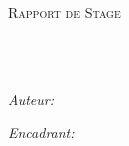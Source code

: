 \documentclass[
11pt, %
fr, %
singlespacing, %
headsepline, %
]{MastersDoctoralThesis} %
\author{Maxime \textsc{PICO}}
\begin{document}
\frontmatter %

\pagestyle{plain} %


\begin{titlepage}
\begin{center}

\vspace*{.06\textheight}
{\scshape\LARGE \univname\par}\vspace{1.5cm} %
\textsc{\Large Rapport de Stage}\\[0.5cm] %

\HRule \\[0.4cm] %
{\huge \bfseries \ttitle\par}\vspace{0.4cm} %
\HRule \\[1.5cm] %

\begin{minipage}[t]{0.4\textwidth}
\begin{flushleft} \large
\emph{Auteur:}\\
\authorname
\end{flushleft}
\end{minipage}
\begin{minipage}[t]{0.4\textwidth}
\begin{flushright} \large
\emph{Encadrant:} \\
\href{https://www.labri.fr/perso/falleri/}{\supname}
\end{flushright}
\end{minipage}\\[3cm]


\end{center}
\end{titlepage}
\end{document}
